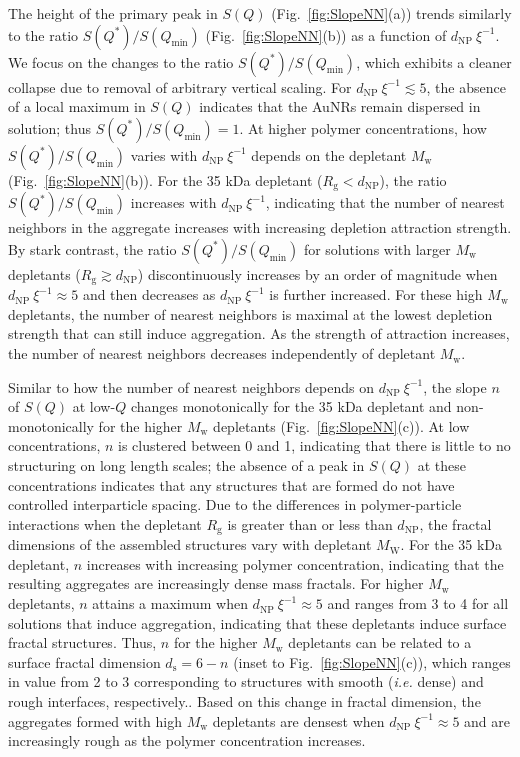 \documentclass[journal=jacsat, superscriptaddress]{achemso}
\def\EDITS#1{{\color{black}#1}}
\def\EDITS#1{#1}
\begin{document}
The height of the primary peak in $S(Q)$ (Fig.\ \ref{fig:SlopeNN}(a)) trends similarly to the ratio $S(Q^*)/S(Q_\mathrm{min})$ (Fig.\ \ref{fig:SlopeNN}(b)) as a function of $d_\mathrm{NP} \: \xi^{-1}$. We focus on the changes to the ratio $S(Q^*)/S(Q_\mathrm{min})$, which exhibits a cleaner collapse due to removal of arbitrary vertical scaling. For $d_\mathrm{NP}\:\xi^{-1} \lesssim 5$, the absence of a local maximum in $S(Q)$ indicates that the AuNRs remain dispersed in solution; thus $S(Q^*)/S(Q_\mathrm{min}) = 1$. At higher polymer concentrations, how $S(Q^*)/S(Q_\mathrm{min})$ varies with $d_\mathrm{NP}\:\xi^{-1}$ depends on the depletant $M_\mathrm{w}$ (Fig.\ \ref{fig:SlopeNN}(b)). For the 35 kDa depletant ($R_\mathrm{g} < d_\mathrm{NP}$), the ratio $S(Q^*)/S(Q_\mathrm{min})$ increases with $d_\mathrm{NP}\:\xi^{-1}$, indicating that the number of nearest neighbors in the aggregate increases with increasing depletion attraction strength. By stark contrast, the ratio $S(Q^*)/S(Q_\mathrm{min})$ for solutions with larger $M_\mathrm{w}$ depletants ($R_\mathrm{g} \gtrsim d_\mathrm{NP}$) discontinuously increases by an order of magnitude when $d_\mathrm{NP}\: \xi^{-1} \approx 5$ and then decreases as $d_\mathrm{NP}\: \xi^{-1}$ is further increased. For these high $M_\mathrm{w}$ depletants, the number of nearest neighbors is maximal at the lowest depletion strength that can still induce aggregation. As the strength of attraction increases, the number of nearest neighbors decreases independently of depletant $M_\mathrm{w}$.

Similar to how the number of nearest neighbors depends on $d_\mathrm{NP}\:\xi^{-1}$, the slope $n$ of $S(Q)$ at low-$Q$ changes monotonically for the 35 kDa depletant and non-monotonically for the higher $M_\mathrm{w}$ depletants (Fig.\ \ref{fig:SlopeNN}(c)). At low concentrations, $n$ is clustered between 0 and 1, indicating that there is little to no structuring on long length scales; the absence of a peak in $S(Q)$ at these concentrations indicates that any structures that are formed do not have controlled interparticle spacing. \EDITS{Due to the differences in polymer-particle interactions when the depletant $R_\mathrm{g}$ is greater than or less than $d_\mathrm{NP}$, the fractal dimensions of the assembled structures vary with depletant $M_\mathrm{W}$.} For the 35 kDa depletant, $n$ increases with increasing  polymer concentration, indicating that the resulting aggregates are increasingly dense mass fractals. For higher $M_\mathrm{w}$ depletants, $n$ attains a maximum when $d_\mathrm{NP}\: \xi^{-1} \approx 5$ and ranges from 3 to 4 for all solutions that induce aggregation\EDITS{, indicating that these depletants induce surface fractal structures.\cite{Schaefer1986,Hurd1987}} Thus, $n$ for the higher $M_\mathrm{w}$ depletants can be related to a surface fractal dimension $d_\mathrm{s} = 6 - n$ (inset to Fig.\ \ref{fig:SlopeNN}(c)), which ranges in value from 2 to 3 corresponding to structures with smooth (\emph{i.e.} dense) and rough interfaces, respectively.\cite{Sinha1989,Radlinski1999}. Based on this change in fractal dimension, the aggregates formed with high $M_\mathrm{w}$ depletants are densest when $d_\mathrm{NP}\: \xi^{-1} \approx 5$ and are increasingly rough as the polymer concentration increases. 
\end{document}
